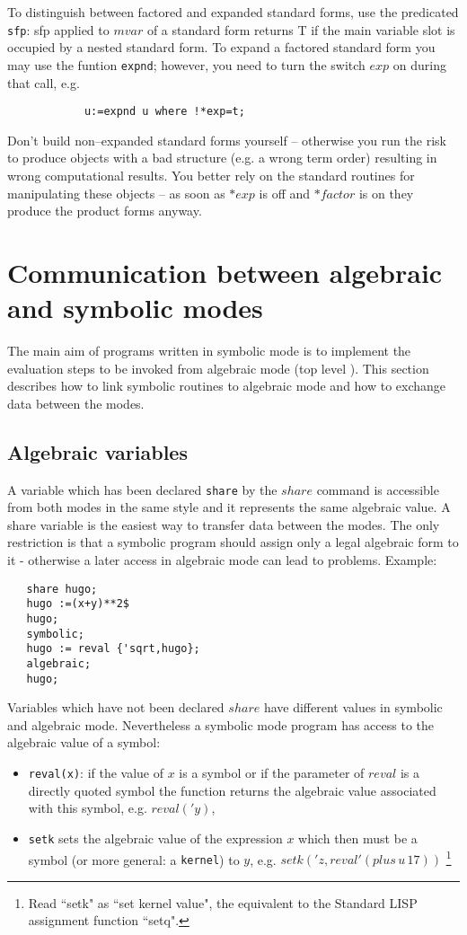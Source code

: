 To distinguish between factored and expanded standard forms, use the
predicated {\tt sfp}: sfp applied to $mvar$ of a standard form returns T
if the main variable slot is occupied by a nested standard form.
To expand a factored standard form you may use the funtion {\tt expnd}; 
however, you need to turn the switch $exp$ on
during that call, e.g.     
\begin{verbatim}
            u:=expnd u where !*exp=t;
\end{verbatim}
Don't build non--expanded standard forms yourself -- otherwise you run
the risk to produce objects with a bad structure (e.g. a wrong term
order) resulting in wrong computational results. You better rely on the
standard routines for manipulating these objects -- as soon as
$*exp$ is off and $*factor$ is on they produce the product forms
anyway.
\section{Communication between algebraic and symbolic modes}

The main aim of programs written in symbolic mode
is to implement the evaluation steps to be invoked from
algebraic mode (top level {\reduce}). This section describes
how to link symbolic routines to algebraic mode 
and how to exchange data between the modes.


\subsection{Algebraic variables}

A variable which has been declared {\tt share} by the {\reduce}
$share$ command is accessible from both modes in the
same style and it represents the same algebraic value.
A share variable is the easiest way to transfer data
between the modes. The only restriction is that a
symbolic program should assign only a legal algebraic
form to it - otherwise a later access in algebraic mode
can lead to problems. Example:

\begin{verbatim}
   share hugo;
   hugo :=(x+y)**2$
   hugo;
   symbolic;
   hugo := reval {'sqrt,hugo};
   algebraic;
   hugo;
\end{verbatim}

Variables which have not been declared $share$ have
different values in symbolic and algebraic mode.
Nevertheless a symbolic mode program has access to the
algebraic value of a symbol:
\begin{itemize}
\item {\tt reval(x)}: if the value of $x$ is a symbol 
or if the parameter of $reval$ is a directly quoted symbol
the function returns the algebraic value associated with this
symbol, e.g. $reval('y)$,
\item {\tt setk} sets the algebraic value of the expression
 $x$ which then must be a symbol (or more general: 
a {\tt kernel})
to  $y$, e.g. $setk('z,reval'(plus\, u\, 17))$
\footnote{Read ``setk" as ``set kernel value", the {\reduce}
equivalent to the Standard LISP assignment function ``setq".}
\end{itemize}

